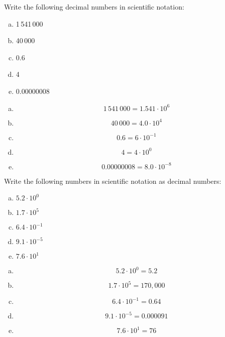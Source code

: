 \documentclass[11pt,letterpaper]{article}
\begin{document}

 Write the following decimal numbers in scientific notation:
	\begin{enumerate}[(a)]
	\item 1\,541\,000
	\item 40\,000
	\item 0.6
	\item 4
	\item 0.00000008
	\end{enumerate} \pspace

\sol
\begin{enumerate}[(a)]
\item 
	\[
	1\,541\,000= 1.541 \cdot 10^6
	\] \pspace

\item 
	\[
	40\,000= 4.0 \cdot 10^4
	\] \pspace

\item 
	\[
	0.6= 6 \cdot 10^{-1}
	\] \pspace

\item 
	\[
	4= 4 \cdot 10^0
	\] \pspace

\item 
	\[
	0.00000008= 8.0 \cdot 10^{-8}
	\]
\end{enumerate}



\newpage



 Write the following numbers in scientific notation as decimal numbers:
	\begin{enumerate}[(a)]
	\item $5.2 \cdot 10^0$
	\item $1.7 \cdot 10^5$
	\item $6.4 \cdot 10^{-1}$
	\item $9.1 \cdot 10^{-5}$
	\item $7.6 \cdot 10^1$
	\end{enumerate} \pspace

\sol
\begin{enumerate}[(a)]
\item 
	\[
	5.2 \cdot 10^0= 5.2
	\] \pspace

\item 
	\[
	1.7 \cdot 10^5= 170,000
	\] \pspace

\item 
	\[
	6.4 \cdot 10^{-1}= 0.64
	\] \pspace

\item 
	\[
	9.1 \cdot 10^{-5}= 0.000091
	\] \pspace

\item
	\[
	7.6 \cdot 10^1= 76
	\]
\end{enumerate}
\end{document}
